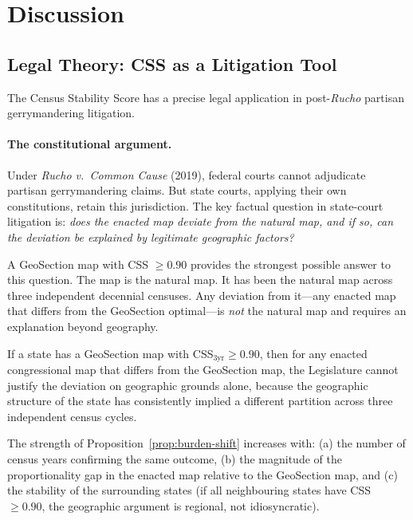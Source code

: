 \section{Discussion}
\label{sec:discussion}

\subsection{Legal Theory: CSS as a Litigation Tool}
\label{sec:legal}

The Census Stability Score has a precise legal application in
post-\emph{Rucho} partisan gerrymandering litigation.

\paragraph{The constitutional argument.}
Under \emph{Rucho v.\ Common Cause} (2019), federal courts cannot adjudicate
partisan gerrymandering claims.
But state courts, applying their own constitutions, retain this jurisdiction.
The key factual question in state-court litigation is: \emph{does the enacted
map deviate from the natural map, and if so, can the deviation be explained
by legitimate geographic factors?}

A GeoSection map with CSS $\geq 0.90$ provides the strongest possible answer
to this question.
The map is the natural map.
It has been the natural map across three independent decennial censuses.
Any deviation from it---any enacted map that differs from the GeoSection
optimal---is \emph{not} the natural map and requires an explanation beyond
geography.

\begin{proposition}
\label{prop:burden-shift}
If a state has a GeoSection map with CSS$_{3\text{yr}} \geq 0.90$, then
for any enacted congressional map that differs from the GeoSection map,
the Legislature cannot justify the deviation on geographic grounds alone,
because the geographic structure of the state has consistently implied a
different partition across three independent census cycles.
\end{proposition}

The strength of Proposition~\ref{prop:burden-shift} increases with:
(a) the number of census years confirming the same outcome,
(b) the magnitude of the proportionality gap in the enacted map relative
to the GeoSection map, and
(c) the stability of the surrounding states (if all neighbouring states
have CSS $\geq 0.90$, the geographic argument is regional, not idiosyncratic).

